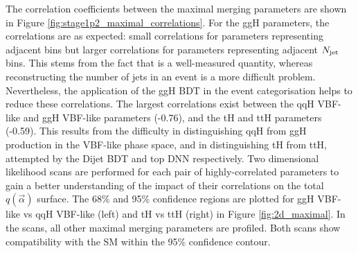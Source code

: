 The correlation coefficients between the maximal merging parameters are shown in Figure \ref{fig:stage1p2_maximal_correlations}. For the ggH parameters, the correlations are as expected: small correlations for parameters representing adjacent \ptH bins but larger correlations for parameters representing adjacent $N_{\rm{jet}}$ bins. This stems from the fact that \ptgg is a well-measured quantity, whereas reconstructing the number of jets in an event is a more difficult problem. Nevertheless, the application of the ggH BDT in the event categorisation helps to reduce these correlations. The largest correlations exist between the qqH VBF-like and ggH VBF-like parameters (-0.76), and the tH and ttH parameters (-0.59). This results from the difficulty in distinguishing qqH from ggH production in the VBF-like phase space, and in distinguishing tH from ttH, attempted by the Dijet BDT and top DNN respectively. Two dimensional likelihood scans are performed for each pair of highly-correlated parameters to gain a better understanding of the impact of their correlations on the total $q(\vec{\alpha})$ surface. The 68\% and 95\% confidence regions are plotted for ggH VBF-like vs qqH VBF-like (left) and tH vs ttH (right) in Figure \ref{fig:2d_maximal}. In the scans, all other maximal merging parameters are profiled. Both scans show compatibility with the SM within the 95\% confidence contour.

